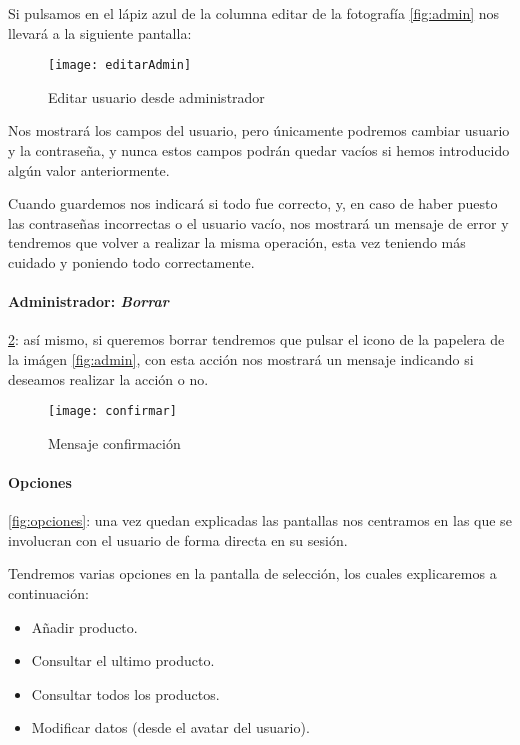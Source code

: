 Si pulsamos en el lápiz azul de la columna editar de la fotografía \ref{fig:admin}  nos llevará a la siguiente pantalla:

 \begin{figure}[H]
    \centering
    \texttt{[image: editarAdmin]}
    \caption{Editar usuario desde administrador}
    \label{fig:editar}
\end{figure}

Nos mostrará los campos del usuario, pero únicamente podremos cambiar usuario y la contraseña, y nunca estos campos podrán quedar vacíos si hemos introducido algún valor anteriormente.

Cuando guardemos nos indicará si todo fue correcto, y, en caso de haber puesto las contraseñas incorrectas o el usuario vacío, nos mostrará un mensaje de error y tendremos que volver a realizar la misma operación, esta vez teniendo más cuidado y poniendo todo correctamente.

\paragraph{Administrador: \textit{Borrar}} \ref{fig:borrar}: así mismo, si queremos borrar tendremos que pulsar el icono de la papelera de la imágen \ref{fig:admin}, con esta acción nos mostrará un mensaje indicando si deseamos realizar la acción o no.

\begin{figure}[H]
	\centering
	\texttt{[image: confirmar]}
	\caption{Mensaje confirmación}
	\label{fig:borrar}
\end{figure}

\paragraph{Opciones}\ref{fig:opciones}: una vez quedan explicadas las pantallas nos centramos en las que se involucran con el usuario de forma directa en su sesión.

Tendremos varias opciones en la pantalla de selección, los cuales explicaremos a continuación:
\begin{itemize}
	\item Añadir producto.
	\item Consultar el ultimo producto.
	\item Consultar todos los productos.
	\item Modificar datos (desde el avatar del usuario).
\end{itemize}

